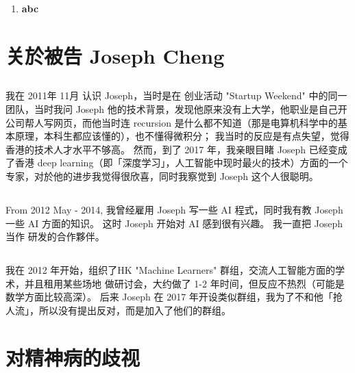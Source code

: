 \documentclass[orivec]{llncs}
\begin{document}
\renewcommand\labelenumi{(\theenumi)}
\begin{enumerate}
	\item \textbf{abc}
\end{enumerate}

\section{关於被告 Joseph Cheng}


\subsection{} 我在 2011年 11月 认识 Joseph，当时是在 创业活动 "Startup Weekend" 中的同一团队，当时我问 Joseph 他的技术背景，发现他原来没有上大学，他职业是自己开公司帮人写网页，而他当时连 recursion 是什么都不知道（那是电算机科学中的基本原理，本科生都应该懂的），也不懂得微积分；  我当时的反应是有点失望，觉得香港的技术人才水平不够高。  然而，到了 2017 年，我亲眼目睹 Joseph 已经变成了香港 deep learning（即「深度学习」，人工智能中现时最火的技术）方面的一个专家，对於他的进步我觉得很欣喜，同时我察觉到 Joseph 这个人很聪明。

\subsection{} From 2012 May - 2014, 我曾经雇用 Joseph 写一些 AI 程式，同时我有教 Joseph 一些 AI 方面的知识。 这时 Joseph 开始对 AI 感到很有兴趣。  我一直把 Joseph 当作 研发的合作夥伴。

\subsection{} 我在 2012 年开始，组织了HK "Machine Learners" 群组，交流人工智能方面的学术，并且租用某些场地 做研讨会，大约做了 1-2 年时间，但反应不热烈（可能是数学方面比较高深）。 后来 Joseph 在 2017 年开设类似群组，我为了不和他「抢人流」，所以没有提出反对，而是加入了他们的群组。 

\section{对精神病的歧视}
\end{document}

